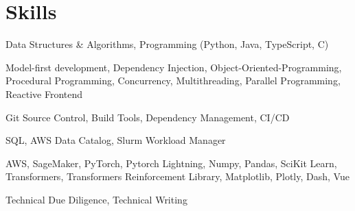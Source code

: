 \documentclass{ExpressiveResume}
\begin{document}
\section{Skills}
\noindent
{}
Data Structures \& Algorithms, Programming (Python, Java, TypeScript,
C)

\noindent
{}
Model-first development, Dependency Injection,
Object-Oriented-Programming, Procedural Programming, Concurrency,
Multithreading, Parallel Programming, Reactive Frontend

\noindent
{} Git Source Control, Build Tools, Dependency Management, CI/CD

\noindent
{} SQL, AWS Data Catalog,
Slurm Workload Manager

\noindent
{} AWS, SageMaker, PyTorch, Pytorch Lightning, Numpy, Pandas, SciKit Learn, Transformers, Transformers Reinforcement Library,
Matplotlib, Plotly, Dash, Vue

\noindent
{} Technical Due Diligence, Technical Writing
\end{document}
